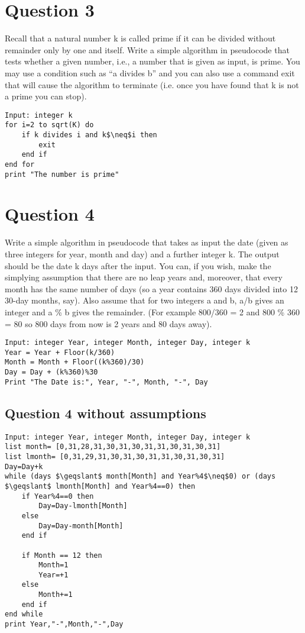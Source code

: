 \documentclass{article}[18pt]
\begin{document}
\section{Question 3}
Recall that a natural number k is called prime if it can be divided without
remainder only by one and itself. Write a simple algorithm in pseudocode
that tests whether a given number, i.e., a number that is given as input, is
prime. You may use a condition such as “a divides b” and you can also use
a command exit that will cause the algorithm to terminate (i.e. once you
have found that k is not a prime you can stop).

\begin{lstlisting}[mathescape=true]
Input: integer k
for i=2 to sqrt(K) do
	if k divides i and k$\neq$i then
		exit
	end if
end for
print "The number is prime"

\end{lstlisting}
\section{Question 4}
Write a simple algorithm in pseudocode that takes as input the date (given as
three integers for year, month and day) and a further integer k. The output
should be the date k days after the input. You can, if you wish, make the
simplying assumption that there are no leap years and, moreover, that every
month has the same number of days (so a year contains 360 days divided
into 12 30-day months, say). Also assume that for two integers a and b, a/b
gives an integer and a \% b gives the remainder. (For example 800/360 = 2
and 800 \% 360 = 80 so 800 days from now is 2 years and 80 days away).
\begin{lstlisting}[mathescape=true]
Input: integer Year, integer Month, integer Day, integer k
Year = Year + Floor(k/360)
Month = Month + Floor((k%360)/30)
Day = Day + (k%360)%30
Print "The Date is:", Year, "-", Month, "-", Day
\end{lstlisting}
\newpage
\subsection{Question 4 without assumptions}
\begin{lstlisting}[mathescape=true]
Input: integer Year, integer Month, integer Day, integer k
list month= [0,31,28,31,30,31,30,31,31,30,31,30,31]
list lmonth= [0,31,29,31,30,31,30,31,31,30,31,30,31]
Day=Day+k
while (days $\geqslant$ month[Month] and Year%4$\neq$0) or (days $\geqslant$ lmonth[Month] and Year%4==0) then
	if Year%4==0 then
		Day=Day-lmonth[Month]
	else 
		Day=Day-month[Month]
	end if
	
	if Month == 12 then
		Month=1
		Year=+1
	else
		Month+=1
	end if
end while
print Year,"-",Month,"-",Day
\end{lstlisting}
\end{document}
